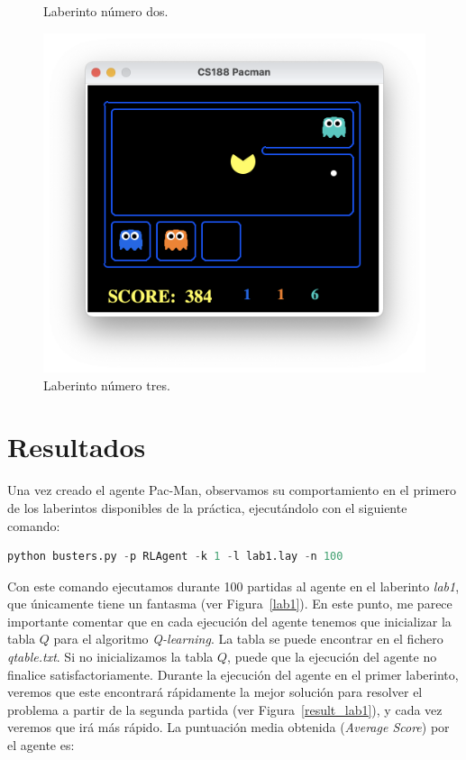 \documentclass[11pt]{exam}
\begin{document}
\begin{figure}[H]
\begin{minipage}[c]{0.35\linewidth}
		\vspace*{-7mm}
		\caption{Laberinto número dos.}
		\label{lab2}
	\end{minipage}
\end{figure}

\vspace*{-7mm}

\begin{figure}[H]
	\centering
	\includegraphics[scale=0.35]{lab3}
	\vspace*{-7mm}
	\caption{Laberinto número tres.}
	\label{lab3}
\end{figure}

\section{Resultados}\label{resultados}

Una vez creado el agente Pac-Man, observamos su comportamiento en el primero de los laberintos disponibles de la práctica, ejecutándolo con el siguiente comando:

\begin{lstlisting}[language=python, basicstyle=\footnotesize]
python busters.py -p RLAgent -k 1 -l lab1.lay -n 100
\end{lstlisting}

Con este comando ejecutamos durante 100 partidas al agente en el laberinto \textit{lab1}, que únicamente tiene un fantasma (ver Figura~\ref{lab1}). En este punto, me parece importante comentar que en cada ejecución del agente tenemos que inicializar la tabla $Q$ para el algoritmo \textit{Q-learning}. La tabla se puede encontrar en el fichero \textit{qtable.txt}. Si no inicializamos la tabla $Q$, puede que la ejecución del agente no finalice satisfactoriamente. Durante la ejecución del agente en el primer laberinto, veremos que este encontrará rápidamente la mejor solución para resolver el problema a partir de la segunda partida (ver Figura~\ref{result_lab1}), y cada vez veremos que irá más rápido. La puntuación media obtenida (\textit{Average Score}) por el agente es:
\end{document}
